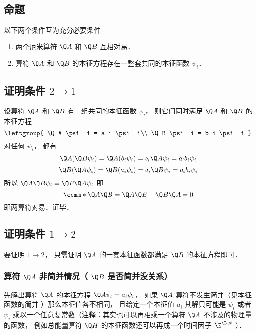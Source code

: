 

\subsection{命题}
以下两个条件互为充分必要条件
\begin{enumerate}
\item 两个厄米算符 $\Q A$ 和 $\Q B$ 互相对易．
\item 算符 $\Q A$ 和 $\Q B$ 的本征方程存在一整套共同的本征函数 $\psi_i$．
\end{enumerate}

\subsection{证明条件 $2 \to 1$}
设算符 $\Q A$ 和 $\Q B$ 有一组共同的本征函数 $\psi_i$，  则它们同时满足 $\Q A$ 和 $\Q B$ 的本征方程
\begin{equation}
\leftgroup{
\Q A \psi_i = a_i \psi_i\\
\Q B \psi_i = b_i \psi_i
}\end{equation}
对任何 $\psi_i$，  都有
\begin{equation}
\Q A (\Q B \psi_i) = \Q A (b_i \psi_i) = b_i\Q A \psi_i = a_i b_i \psi_i
\end{equation}
\begin{equation}
\Q B (\Q A \psi_i) = \Q B (a_i \psi_i) = a_i \Q B \psi_i = a_i b_i \psi_i
\end{equation}
所以 $\Q A\Q B \psi_i = \Q B\Q A \psi_i$ 即
\begin{equation}
\comm*{\Q A}{\Q B} = \Q A\Q B - \Q B\Q A = 0
\end{equation}
即两算符对易．证毕．

\subsection{证明条件 $1 \to 2$}
要证明 $1 \to 2$，  只需证明 $\Q A$ 的一套本征函数都满足 $\Q B$ 的本征方程即可．

\subsubsection{算符 $\Q A$ 非简并情况（ $\Q B$ 是否简并没关系）}
先解出算符 $\Q A$ 的本征方程 $\Q A \psi_i = a_i \psi_i$，  如果 $\Q A$ 算符不发生简并（见本征函数的简并%
  ）那么本征值各不相同， 且给定一个本征值 $a_i$ 其解只可能是 $\psi_i$ 或者 $\psi_i$ 乘以一个任意复常数（注释：其实也可以再相乘一个算符 $\Q A$ 不涉及的物理量的函数， 例如总能量算符 $\Q H$ 的本征函数还可以再成一个时间因子 $\E^{\I\omega t}$ ）．

